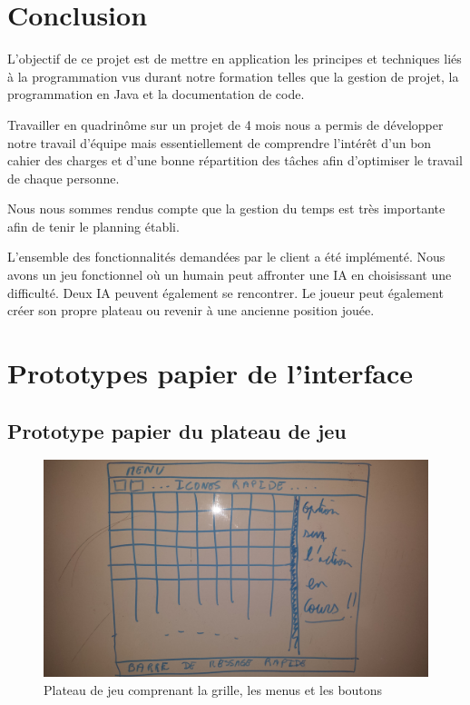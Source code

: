 \documentclass[a4paper,12pt]{report}
\begin{document}
\chapter*{Conclusion}

L’objectif de ce projet est de mettre en application les principes et techniques liés à la programmation vus durant notre formation telles que la gestion de projet, la programmation en Java et la documentation de code.

Travailler en quadrinôme sur un projet de 4 mois nous a permis de développer notre travail d’équipe mais essentiellement de comprendre l’intérêt d’un bon cahier des charges et d’une bonne répartition des tâches afin d’optimiser le travail de chaque personne.

Nous nous sommes rendus compte que la gestion du temps est très importante afin de tenir le planning établi.

L’ensemble des fonctionnalités demandées par le client a été implémenté. Nous avons un jeu fonctionnel où un humain peut affronter une IA en choisissant une difficulté. Deux IA peuvent également se rencontrer. Le joueur peut également créer son propre plateau ou revenir à une ancienne position jouée.



 

\appendix
{}
\appendixpage
\addappheadtotoc 

\chapter{Prototypes papier de l'interface}
\label{D}

\section{Prototype papier du plateau de jeu}

\begin{figure}[H]
\centering
\includegraphics[scale=0.1]{Besoins/plateau.jpg}
\caption{Plateau de jeu comprenant la grille, les menus et les
  boutons}
\label{plateau}
\end{figure}
\end{document}
